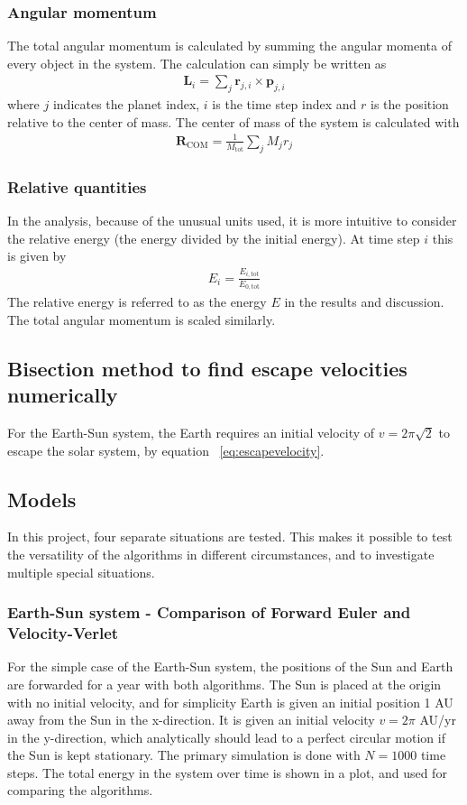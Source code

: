 \documentclass[aps,reprint]{revtex4-1}
\begin{document}
\subsubsection{Angular momentum}
The total angular momentum is calculated by summing the angular momenta of
every object in the system. The calculation can simply be written as
\begin{align}
  \mathbf{L}_i = \sum_j \mathbf{r}_{j,i} \times \mathbf{p}_{j,i}
\end{align}
where $j$ indicates the planet index, $i$ is the time step index and $r$ is the
position relative to the center of mass. The center of mass of the system
is calculated with
\begin{align}
  \mathbf{R}_\text{COM} = \frac{1}{M_\text{tot}} \sum_j M_j r_j
\end{align}
\subsubsection{Relative quantities}
In the analysis, because of the unusual units used, it is more intuitive to
consider the relative energy (the energy divided by the initial energy). At time step $i$
this is given by
\begin{align}
  E_i = \frac{E_{i,\text{tot}}}{E_{0,\text{tot}}}
\end{align}
The relative energy is referred to as the energy $E$ in the results and
discussion. The total angular momentum is scaled similarly.

\subsection{Bisection method to find escape velocities numerically}
For the Earth-Sun system, the Earth requires an initial velocity of
$v = 2 \pi \sqrt{2}$ to escape the solar system, by equation ~\ref{eq:escapevelocity}.



\subsection{Models}
In this project, four separate situations are tested. This makes it possible to test the versatility of the
algorithms in different circumstances, and to investigate multiple special situations.
\subsubsection{Earth-Sun system - Comparison of Forward Euler and Velocity-Verlet}
\label{seq:earthsunmethod}
For the simple case of the Earth-Sun system, the positions of the Sun and Earth are
forwarded for a year with both algorithms. The Sun is placed at the origin with
no initial velocity, and for simplicity Earth is given an initial position 1 AU
away from the Sun in the x-direction. It is given an initial velocity $v = 2\pi$ AU/yr
in the y-direction, which analytically should lead to a perfect circular motion
if the Sun is kept stationary. The primary simulation is done with $N = 1000$ time steps.
The total energy in the system over time is shown in a plot, and used for
comparing the algorithms.
\end{document}
